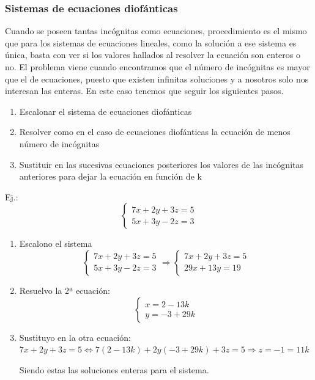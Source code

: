 \documentclass[10pt,a4paper,openright]{book}
\begin{document}
\subsubsection*{Sistemas de ecuaciones diofánticas}
Cuando se poseen tantas incógnitas como ecuaciones, procedimiento es el mismo que para los sistemas de ecuaciones lineales, como la solución a ese sistema es única, basta con ver si los valores hallados al resolver la ecuación son enteros o no.
El problema viene cuando encontramos que el número de incógnitas es mayor que el de ecuaciones, puesto que existen infinitas soluciones y a nosotros solo nos interesan las enteras. En este caso tenemos que seguir los siguientes pasos.
\begin{enumerate}
\item Escalonar el sistema de ecuaciones diofánticas

\item Resolver como en el caso de ecuaciones diofánticas la ecuación de menos número de incógnitas

\item Sustituir en las sucesivas ecuaciones posteriores los valores de las incógnitas anteriores para dejar la ecuación en función de k
\end{enumerate}
Ej.:
$$
\begin{cases}
7x+2y+3z=5 \\
5x+3y-2z=3
\end{cases}
$$
\begin{enumerate}
\item Escalono el sistema
$$
\begin{cases}
7x+2y+3z=5 \\
5x+3y-2z=3
\end{cases}
\Rightarrow
\begin{cases}
7x+2y+3z=5 \\
29x+13y=19
\end{cases}
$$

\item Resuelvo la 2ª ecuación:
$$
\begin{cases}
x=2-13k \\
y=-3+29k
\end{cases}
$$

\item Sustituyo en la otra ecuación:
$7x+2y+3z=5\Leftrightarrow 7(2-13k)+2y(-3+29k)+3z=5\Rightarrow z=-1=11k$

Siendo estas las soluciones enteras para el sistema.
\end{enumerate}
\end{document}
